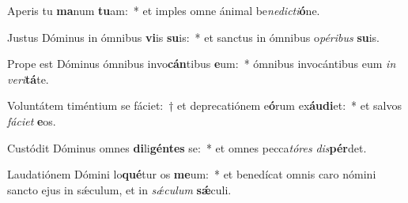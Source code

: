 \item Aperis tu \textbf{ma}num \textbf{tu}am:~* et imples omne ánimal be\textit{ne}\textit{dic}\textit{ti}\textbf{ó}ne.
\item Justus Dóminus in ómnibus \textbf{vi}is \textbf{su}is:~* et sanctus in ómnibus o\textit{pé}\textit{ri}\textit{bus} \textbf{su}is.
\item Prope est Dóminus ómnibus invo\textbf{cán}tibus \textbf{e}um:~* ómnibus invocántibus eum \textit{in} \textit{ve}\textit{ri}\textbf{tá}te.
\item Voluntátem timéntium se fáciet:~† et deprecatiónem e\textbf{ó}rum ex\textbf{áu}\textbf{di}et:~* et salvos \textit{fá}\textit{ci}\textit{et} \textbf{e}os.
\item Custódit Dóminus omnes \textbf{di}li\textbf{gén}\textbf{tes} se:~* et omnes pecca\textit{tó}\textit{res} \textit{dis}\textbf{pér}det.
\item Laudatiónem Dómini lo\textbf{qué}tur os \textbf{me}um:~* et benedícat omnis caro nómini sancto ejus in sǽculum, et in \textit{sǽ}\textit{cu}\textit{lum} \textbf{sǽ}culi.
